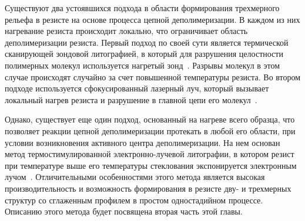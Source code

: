 Существуют два устоявшихся подхода в области формирования трехмерного рельефа в резисте на основе процесса цепной деполимеризации. В каждом из них нагревание резиста происходит локально, что ограничивает область деполимеризации резиста. Первый подход по своей сути является термической сканирующей зондовой литографией, в который для разрушения целостности полимерных молекул используется нагретый зонд~\cite{depol_fabrication_probe}. Разрывы молекул в этом случае происходят случайно за счет повышенной температуры резиста. Во втором подходе используется сфокусированный лазерный луч, который вызывает локальный нагрев резиста и разрушение в главной цепи его молекул~\cite{depol_fabrication_laser}.

Однако, существует еще один подход, основанный на нагреве всего образца, что позволяет реакции цепной деполимеризации протекать в любой его области, при условии возникновения активного центра деполимеризации. На нем основан метод термостимулированной электронно-лучевой литографии, в котором резист при температуре выше его температуры стеклования экспонируется электронным лучом~\cite{Bruk_2016_mee}. Отличительными особенностями этого метода является высокая производительность и возможность формирования в резисте дву- и трехмерных структур со сглаженным профилем в простом одностадийном процессе. Описанию этого метода будет посвящена вторая часть этой главы.
